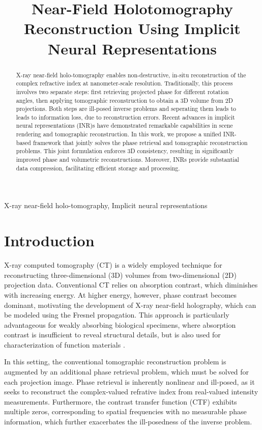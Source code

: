 \documentclass{article}
\title{Near-Field Holotomography Reconstruction Using Implicit Neural Representations}
\begin{document}
%
\maketitle
%
\begin{abstract}
X-ray near-field holo-tomography enables non-destructive, in-situ reconstruction of the complex refractive index at nanometer-scale resolution.
Traditionally, this process involves two separate steps: first retrieving projected phase for different rotation angles, then applying tomographic reconstruction to obtain a 3D volume from 2D projections.
Both steps are ill-posed inverse problems and seperating them leads to leads to information loss, due to reconstruction errors.
Recent advances in implicit neural representations (INR)s have demonstrated remarkable capabilities in scene rendering and tomographic reconstruction.
In this work, we propose a unified INR-based framework that jointly solves the phase retrieval and tomographic reconstruction problems.
This joint formulation enforces 3D consistency, resulting in significantly improved phase and volumetric reconstructions.
Moreover, INRs provide substantial data compression, facilitating efficient storage and processing.
\end{abstract}
%
\begin{keywords}
X-ray near-field holo-tomography, Implicit neural representations
\end{keywords}
%
\section{Introduction}
\label{sec:intro}
X-ray computed tomography (CT) is a widely employed technique for reconstructing three-dimensional (3D) volumes from two-dimensional (2D) projection data.
Conventional CT relies on absorption contrast, which diminishes with increasing energy. 
At higher energy, however, phase contrast becomes dominant, motivating the development of X-ray near-field holography, which can be modeled using the Fresnel propagation.
This approach is particularly advantageous for weakly absorbing biological specimens, where absorption contrast is insufficient to reveal structural details, but is also used for characterization of function materials \cite{vesely3DXrayNanotomography2021a,flennerHardXrayNanoholotomography2020b,gerhardtThreedimensionalArchitectureLinearized2025,reimersDevelopmentBioreactorCoupledFlowCell2023}.

In this setting, the conventional tomographic reconstruction problem is augmented by an additional phase retrieval problem, which must be solved for each projection image.
Phase retrieval is inherently nonlinear and ill-posed, as it seeks to reconstruct the complex-valued refrative index from real-valued intensity measurements.
Furthermore, the contrast transfer function (CTF) exhibits multiple zeros, corresponding to spatial frequencies with no measurable phase information, which further exacerbates the ill-posedness of the inverse problem.
\end{document}
